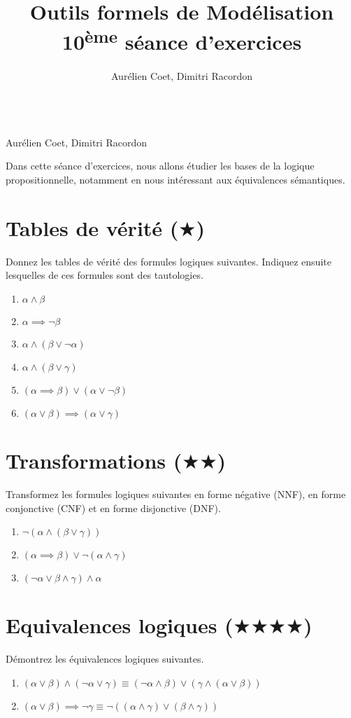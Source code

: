 \documentclass[a4paper, titlepage]{article}
\makeatletter
\numberwithin{figure}{section}
\numberwithin{table}{section}
\newcommand\objective[1]{\def\@objective{#1}}
\newcommand{\makecustomtitle}{%
	\begin{center}
		\huge\@title \\
		[1ex]\small Aurélien Coet, Dimitri Racordon \\
	\end{center}
	\@objective
}
\makeatother
\begin{document}
  \title{Outils formels de Modélisation \\ 10\textsuperscript{ème} séance d'exercices}
  \author{Aurélien Coet, Dimitri Racordon}
	\objective{Dans cette séance d'exercices, nous allons étudier les bases de la logique propositionnelle, notamment en nous intéressant aux équivalences sémantiques.}

	\makecustomtitle

  \section{Tables de vérité ($\bigstar$)}
    Donnez les tables de vérité des formules logiques suivantes. Indiquez ensuite lesquelles de ces formules sont des tautologies.
    \begin{multicols}{2}
      \begin{enumerate}
        \item $\alpha \land \beta$
        \item $\alpha \implies \lnot\beta$
        \item $\alpha \land (\beta \lor \lnot\alpha)$
        \item $\alpha \land (\beta \lor \gamma)$
        \item $(\alpha \implies \beta) \lor (\alpha \lor \lnot\beta)$
        \item $(\alpha \lor \beta) \implies (\alpha \lor \gamma)$
      \end{enumerate}
    \end{multicols}

  \section{Transformations ($\bigstar\bigstar$)}
    Transformez les formules logiques suivantes en forme négative (NNF), en forme conjonctive (CNF) et en forme disjonctive (DNF).
    \begin{multicols}{2}
      \begin{enumerate}
        \item $\lnot(\alpha \land (\beta \lor \gamma))$
        \item $(\alpha \implies \beta) \lor \lnot(\alpha \land \gamma)$
        \item $(\lnot\alpha \lor \beta \land \gamma) \land \alpha$
      \end{enumerate}
    \end{multicols}

  \section{Equivalences logiques ($\bigstar\bigstar\bigstar\bigstar$)}
    Démontrez les équivalences logiques suivantes.
    \begin{enumerate}
      \item $(\alpha \lor \beta) \land (\lnot\alpha \lor \gamma)
              \equiv (\lnot\alpha \land \beta) \lor (\gamma \land (\alpha \lor \beta))$
      \item $(\alpha \lor \beta) \implies \lnot\gamma
              \equiv \lnot((\alpha \land \gamma) \lor (\beta \land \gamma))$
    \end{enumerate}
\end{document}
